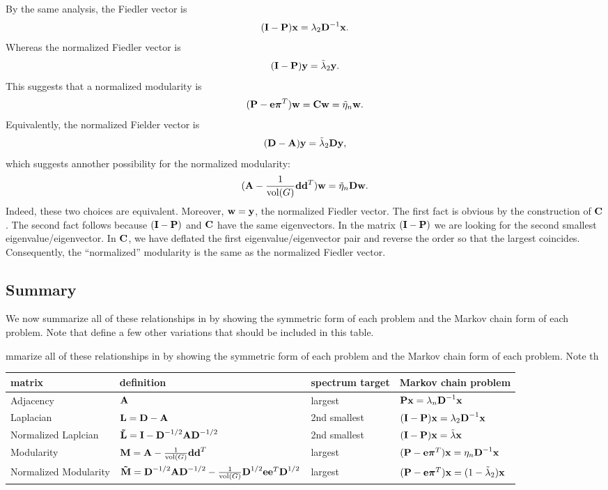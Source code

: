 \documentclass[nofonts]{dgleich-article}
\DeclareMathOperator{\vol}{vol}
\newcommand{\mnL}{\mat{\tilde{L}}}
\newcommand{\mnM}{\mat{\tilde{M}}}
\newcommand{\tlambda}{\tilde{\lambda}}
\newcommand{\teta}{\tilde{\eta}}
\renewcommand{\vpi}{\vec{\pi}}
\begin{document}
By the same analysis, the Fiedler vector is 
\[ (\boldsymbol{\mathrm{I}} - \boldsymbol{\mathrm{P}}) \boldsymbol{\mathrm{x}} = \lambda_{2} \boldsymbol{\mathrm{D}}^{-1} \boldsymbol{\mathrm{x}}. \]
Whereas the normalized Fiedler vector is 
\[ (\eye - \mP) \vy = \tlambda_2 \vy. \]
This suggests that a normalized modularity is 
\[ (\mP - \ve \vpi^T) \vw = \mC \vw = \teta_n \vw. \]
Equivalently, the normalized Fielder vector is 
\[ (\mD - \mA) \vy = \tlambda_2 \mD \vy,\]
which suggests annother possibility for the normalized modularity: 
\[ (\mA - \frac{1}{\vol(G)} \vd \vd^T) \vw = \teta_n \mD \vw. \]
Indeed, these two choices are equivalent.  Moreover, $\boldsymbol{\mathrm{w}} = \boldsymbol{\mathrm{y}}$, 
the normalized Fiedler vector.  The first fact is obvious 
by the construction of $\boldsymbol{\mathrm{C}}$.  The second fact follows because
$(\boldsymbol{\mathrm{I}} - \boldsymbol{\mathrm{P}})$ and $\boldsymbol{\mathrm{C}}$ have the same eigenvectors.  In the matrix
$(\boldsymbol{\mathrm{I}} - \boldsymbol{\mathrm{P}})$ we are looking for the second smallest eigenvalue/eigenvector.  
In $\boldsymbol{\mathrm{C}}$, we have deflated the first eigenvalue/eigenvector pair and reverse
the order so that the largest coincides.  Consequently, 
the ``normalized'' modularity is the same as the normalized Fiedler vector.  

\subsection{Summary}

We now summarize all of these relationships in by showing the symmetric form
of each problem and the Markov chain form of each problem.  Note that 
\citet{Shi2000-normalized-cuts} define a few other variations that
should be included in this table.  
\begin{fullwidthtable}
\caption{mmarize all of these relationships in by showing the symmetric form
of each problem and the Markov chain form of each problem.  Note th}
 \begin{tabularx}{\linewidth}{XlXX}
  \toprule
   matrix & definition & spectrum target & Markov chain problem\\
  \midrule
   Adjacency & $\boldsymbol{\mathrm{A}}$ & largest & $\boldsymbol{\mathrm{P}} \boldsymbol{\mathrm{x}} = \lambda_n \boldsymbol{\mathrm{D}}^{-1} \boldsymbol{\mathrm{x}}$\\[1ex]
   Laplacian & $\boldsymbol{\mathrm{L}} = \boldsymbol{\mathrm{D}} - \boldsymbol{\mathrm{A}}$ & 2nd smallest & $(\boldsymbol{\mathrm{I}} - \boldsymbol{\mathrm{P}}) \boldsymbol{\mathrm{x}} = \lambda_{2} \boldsymbol{\mathrm{D}}^{-1} \boldsymbol{\mathrm{x}}$\\[1ex]
   Normalized Laplcian & $\mnL = \eye - \mD^{-1/2} \mA \mD^{-1/2}$ & 2nd smallest 
     & $(\eye - \mP) \vx = \tlambda \vx$\\[1ex]
   Modularity & $\mM = \mA - \frac{1}{\vol(G)} \vd \vd^T$ & largest 
     & $(\mP - \ve \vpi^T) \vx = \eta_n \mD^{-1} \vx$\\[1ex]
   Normalized Modularity & $\mnM = \mD^{-1/2} \mA \mD^{-1/2} - \frac{1}{\vol(G)} \mD^{1/2} \ve \ve^T \mD^{1/2}$
     & largest & $(\mP - \ve \vpi^T) \vx = (1-\tlambda_2) \vx$\\ 
   \bottomrule
 \end{tabularx}
\end{fullwidthtable}
\end{document}
